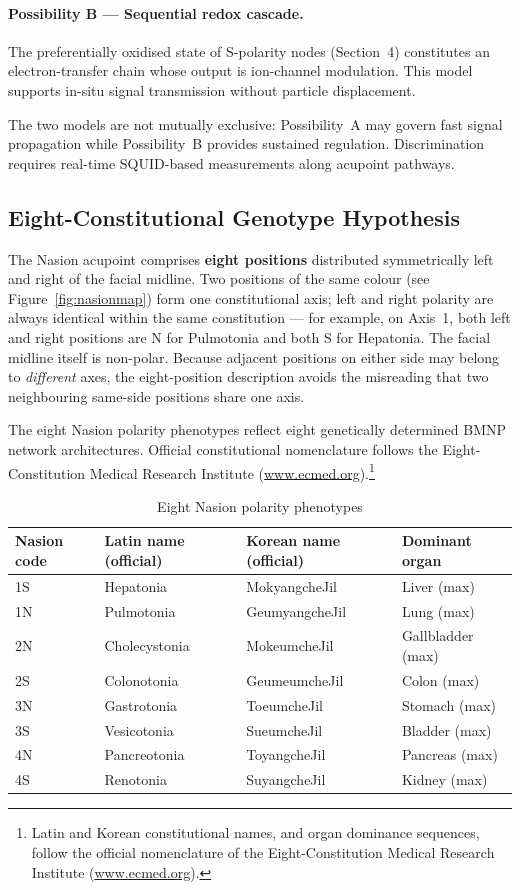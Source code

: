 \documentclass[12pt,a4paper]{article}
\begin{document}
\paragraph{Possibility B --- Sequential redox cascade.}
The preferentially oxidised state of S-polarity nodes (Section~4)
constitutes an electron-transfer chain whose output is ion-channel
modulation.  This model supports in-situ signal transmission without
particle displacement.

The two models are not mutually exclusive: Possibility~A may govern
fast signal propagation while Possibility~B provides sustained
regulation.  Discrimination requires real-time SQUID-based measurements
along acupoint pathways.

\subsection{Eight-Constitutional Genotype Hypothesis}
The Nasion acupoint comprises \textbf{eight positions} distributed
symmetrically left and right of the facial midline.
Two positions of the same colour (see Figure~\ref{fig:nasionmap})
form one constitutional axis; left and right polarity are always
identical within the same constitution --- for example, on Axis~1,
both left and right positions are N for Pulmotonia and both S for
Hepatonia.  The facial midline itself is non-polar.
Because adjacent positions on either side may belong to \emph{different}
axes, the eight-position description avoids the misreading that two
neighbouring same-side positions share one axis.

The eight Nasion polarity phenotypes reflect eight genetically determined
BMNP network architectures.  Official constitutional nomenclature follows
the Eight-Constitution Medical Research Institute
(\url{www.ecmed.org}).\footnote{%
  Latin and Korean constitutional names, and organ dominance sequences,
  follow the official nomenclature of the Eight-Constitution Medical
  Research Institute (\url{www.ecmed.org}).}

\begin{table}[h]
\centering
\caption{Eight Nasion polarity phenotypes}
\begin{tabular}{llll}
\toprule
Nasion code & Latin name (official) & Korean name (official) &
  Dominant organ \\
\midrule
1S & Hepatonia   & MokyangcheJil & Liver (max) \\
1N & Pulmotonia  & GeumyangcheJil & Lung (max) \\
2N & Cholecystonia & MokeumcheJil & Gallbladder (max) \\
2S & Colonotonia & GeumeumcheJil & Colon (max) \\
3N & Gastrotonia & ToeumcheJil & Stomach (max) \\
3S & Vesicotonia & SueumcheJil & Bladder (max) \\
4N & Pancreotonia & ToyangcheJil & Pancreas (max) \\
4S & Renotonia   & SuyangcheJil & Kidney (max) \\
\bottomrule
\end{tabular}
\end{table}
\end{document}
